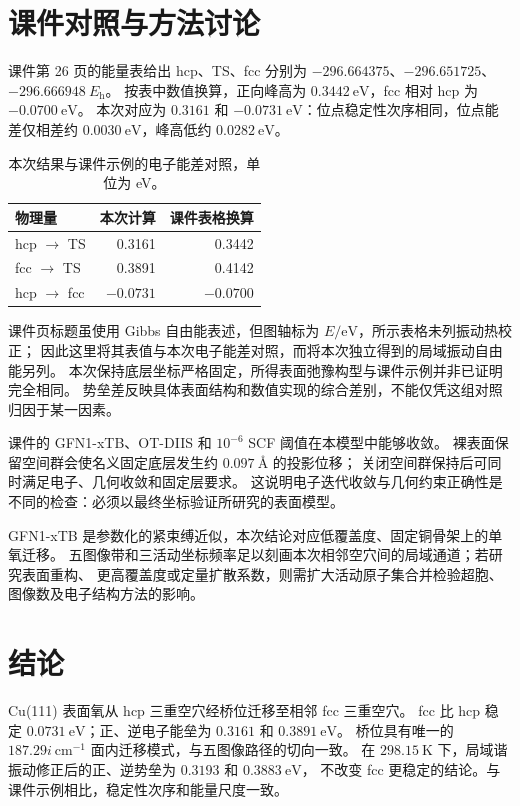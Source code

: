 \documentclass[UTF8,a4paper,12pt,fontset=fandol]{ctexart}
\newcommand{\eV}{\mathrm{eV}}
\begin{document}
\section{课件对照与方法讨论}
课件第 26 页的能量表给出 hcp、TS、fcc 分别为
$-296.664375$、$-296.651725$、$-296.666948\ E_{\mathrm h}$\cite{course}。
按表中数值换算，正向峰高为 $0.3442\ \eV$，fcc 相对 hcp 为 $-0.0700\ \eV$。
本次对应为 $0.3161$ 和 $-0.0731\ \eV$：位点稳定性次序相同，位点能差仅相差约
$0.0030\ \eV$，峰高低约 $0.0282\ \eV$。

\begin{table}[htbp]
\centering
\caption{本次结果与课件示例的电子能差对照，单位为 eV。}
\begin{tabular}{lrr}
\toprule 物理量 & 本次计算 & 课件表格换算\\\midrule
hcp $\to$ TS & 0.3161 & 0.3442\\
fcc $\to$ TS & 0.3891 & 0.4142\\
hcp $\to$ fcc & $-0.0731$ & $-0.0700$\\\bottomrule
\end{tabular}
\end{table}

课件页标题虽使用 Gibbs 自由能表述，但图轴标为 $E/\eV$，所示表格未列振动热校正；
因此这里将其表值与本次电子能差对照，而将本次独立得到的局域振动自由能另列。
本次保持底层坐标严格固定，所得表面弛豫构型与课件示例并非已证明完全相同。
势垒差反映具体表面结构和数值实现的综合差别，不能仅凭这组对照归因于某一因素。

课件的 GFN1-xTB、OT-DIIS 和 $10^{-6}$ SCF 阈值在本模型中能够收敛。
裸表面保留空间群会使名义固定底层发生约 $0.097\ \text{\AA}$ 的投影位移；
关闭空间群保持后可同时满足电子、几何收敛和固定层要求。
这说明电子迭代收敛与几何约束正确性是不同的检查：必须以最终坐标验证所研究的表面模型。

GFN1-xTB 是参数化的紧束缚近似\cite{gfn1}，本次结论对应低覆盖度、固定铜骨架上的单氧迁移。
五图像带和三活动坐标频率足以刻画本次相邻空穴间的局域通道；若研究表面重构、
更高覆盖度或定量扩散系数，则需扩大活动原子集合并检验超胞、图像数及电子结构方法的影响。

\section{结论}
Cu(111) 表面氧从 hcp 三重空穴经桥位迁移至相邻 fcc 三重空穴。
fcc 比 hcp 稳定 $0.0731\ \eV$；正、逆电子能垒为 $0.3161$ 和 $0.3891\ \eV$。
桥位具有唯一的 $187.29i\ \mathrm{cm^{-1}}$ 面内迁移模式，与五图像路径的切向一致。
在 $298.15\ \mathrm K$ 下，局域谐振动修正后的正、逆势垒为 $0.3193$ 和 $0.3883\ \eV$，
不改变 fcc 更稳定的结论。与课件示例相比，稳定性次序和能量尺度一致。
\end{document}
